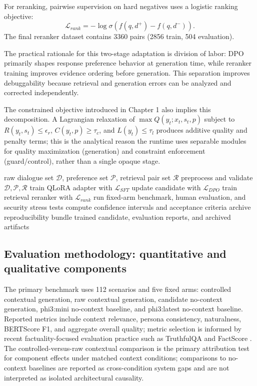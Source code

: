 ﻿\documentclass[a4paper,12pt]{article}
\begin{document}
For reranking, pairwise supervision on hard negatives uses a logistic ranking objective:
\begin{equation}
\mathcal{L}_{rank} = -\log \sigma\!\left(f(q,d^+) - f(q,d^-)\right).
\end{equation}
The final reranker dataset contains 3360 pairs (2856 train, 504 evaluation).

The practical rationale for this two-stage adaptation is division of labor: DPO primarily shapes response preference behavior at generation time, while reranker training improves evidence ordering before generation. This separation improves debuggability because retrieval and generation errors can be analyzed and corrected independently.

The constrained objective introduced in Chapter 1 also implies this decomposition. A Lagrangian relaxation of
\(\max Q(y_t;x_t,s_t,p)\) subject to \(R(y_t,s_t)\le \epsilon_r\), \(C(y_t,p)\ge\tau_c\), and \(L(y_t)\le\tau_l\)
produces additive quality and penalty terms; this is the analytical reason the runtime uses separable modules for quality maximization (generation) and constraint enforcement (guard/control), rather than a single opaque stage.

\begin{algorithm}[H]
\caption{Training and evaluation pipeline}
\begin{algorithmic}[1]
\Require raw dialogue set \(\mathcal{D}\), preference set \(\mathcal{P}\), retrieval pair set \(\mathcal{R}\)
\State preprocess and validate \(\mathcal{D},\mathcal{P},\mathcal{R}\)
\State train QLoRA adapter with \(\mathcal{L}_{SFT}\)
\State update candidate with \(\mathcal{L}_{DPO}\)
\EndIf
\State train retrieval reranker with \(\mathcal{L}_{rank}\)
\State run fixed-arm benchmark, human evaluation, and security stress tests
\State compute confidence intervals and acceptance criteria
\State archive reproducibility bundle
\State \Return trained candidate, evaluation reports, and archived artifacts
\end{algorithmic}
\end{algorithm}

\subsection{Evaluation methodology: quantitative and qualitative components}

The primary benchmark uses 112 scenarios and five fixed arms: controlled contextual generation, raw contextual generation, candidate no-context generation, phi3:mini no-context baseline, and phi3:latest no-context baseline. Reported metrics include context relevance, persona consistency, naturalness, BERTScore F1, and aggregate overall quality; metric selection is informed by recent factuality-focused evaluation practice such as TruthfulQA and FactScore \cite{Lin2021TruthfulQA,Min2023FactScore}.
The controlled-versus-raw contextual comparison is the primary attribution test for component effects under matched context conditions; comparisons to no-context baselines are reported as cross-condition system gaps and are not interpreted as isolated architectural causality.
\end{document}
